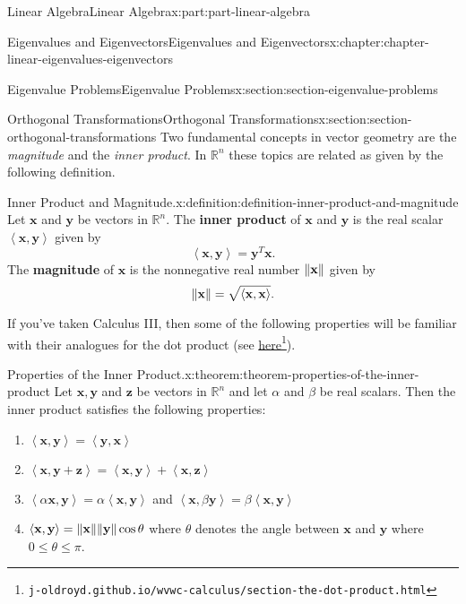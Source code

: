 \documentclass[twoside,10pt,]{book}
\newcommand{\terminology}[1]{\textbf{#1}}
\numberwithin{equation}{part}
\newcommand{\RR}{\mathbb{R}}
\providecommand{\vb}[1]{\mathbf{#1}}
\newcommand{\dotprod}[1]{\left\langle #1 \right\rangle}
\begin{document}
\begin{partptx}{Linear Algebra}{}{Linear Algebra}{}{}{x:part:part-linear-algebra}
\begin{chapterptx}{Eigenvalues and Eigenvectors}{}{Eigenvalues and Eigenvectors}{}{}{x:chapter:chapter-linear-eigenvalues-eigenvectors}
\begin{sectionptx}{Eigenvalue Problems}{}{Eigenvalue Problems}{}{}{x:section:section-eigenvalue-problems}
\end{sectionptx}
%
%
\typeout{************************************************}
\typeout{************************************************}
%
\begin{sectionptx}{Orthogonal Transformations}{}{Orthogonal Transformations}{}{}{x:section:section-orthogonal-transformations}
Two fundamental concepts in vector geometry are the \emph{magnitude} and the \emph{inner product}. In \(\RR^n\) these topics are related as given by the following definition.%
\begin{definition}{Inner Product and Magnitude.}{x:definition:definition-inner-product-and-magnitude}%
%
%
Let \(\vb{x}\) and \(\vb{y}\) be vectors in \(\RR^n\). The \terminology{inner product} of \(\vb{x}\) and \(\vb{y}\) is the real scalar \(\dotprod{\vb{x},\vb{y}}\) given by%
\begin{equation*}
\dotprod{\vb{x},\vb{y}} = \vb{y}^{T}\vb{x}.
\end{equation*}
The \terminology{magnitude} of \(\vb{x}\) is the nonnegative real number \(\norm{\vb{x}}\) given by%
\begin{equation*}
\norm{\vb{x}} = \sqrt{\dotprod{\vb{x},\vb{x}}}.
\end{equation*}
%
\end{definition}
If you've taken Calculus III, then some of the following properties will be familiar with their analogues for the dot product (see \href{https://j-oldroyd.github.io/wvwc-calculus/section-the-dot-product.html}{here}\footnote{\nolinkurl{j-oldroyd.github.io/wvwc-calculus/section-the-dot-product.html}\label{g:fn:idm1630769080}}).%
\begin{theorem}{Properties of the Inner Product.}{}{x:theorem:theorem-properties-of-the-inner-product}%
Let \(\vb{x}, \vb{y}\) and \(\vb{z}\) be vectors in \(\RR^n\) and let \(\alpha\) and \(\beta\) be real scalars. Then the inner product satisfies the following properties:%
\begin{enumerate}
\item{}\(\displaystyle \dotprod{\vb{x},\vb{y}} = \dotprod{\vb{y},\vb{x}}\)%
\item{}\(\displaystyle \dotprod{\vb{x}, \vb{y}+\vb{z}} = \dotprod{\vb{x},\vb{y}} + \dotprod{\vb{x},\vb{z}}\)%
\item{}\(\dotprod{\alpha\vb{x},\vb{y}} = \alpha\dotprod{\vb{x},\vb{y}}\) and \(\dotprod{\vb{x},\beta\vb{y}} = \beta\dotprod{\vb{x},\vb{y}}\)%
\item{}\(\dotprod{\vb{x},\vb{y}} = \norm{\vb{x}}\norm{\vb{y}}\cos\theta\) where \(\theta\) denotes the angle between \(\vb{x}\) and \(\vb{y}\) where \(0\leq\theta\leq \pi\).%

\end{enumerate}
\end{theorem}
\end{sectionptx}
\end{chapterptx}
\end{partptx}
\end{document}
